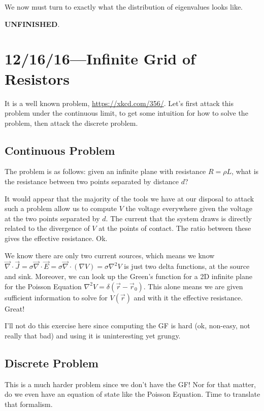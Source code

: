 \documentclass[12pt]{report}
\begin{document}
We now must turn to exactly what the distribution of eigenvalues looks like.

\textbf{UNFINISHED}.

\chapter{12/16/16---Infinite Grid of Resistors}

It is a well known problem, \url{https://xkcd.com/356/}. Let's first attack this
problem under the continuous limit, to get some intuition for how to solve the
problem, then attack the discrete problem.

\section{Continuous Problem}

The problem is as follows: given an infinite plane with resistance $R = \rho L$,
what is the resistance between two points separated by distance $d$?

It would appear that the majority of the tools we have at our disposal to attack
such a problem allow us to compute $V$ the voltage everywhere given the voltage
at the two points separated by $d$. The current that the system draws is
directly related to the divergence of $V$ at the points of contact. The ratio
between these gives the effective resistance. Ok.

We know there are only two current sources, which means we know $\vec{\nabla}
\cdot \vec{J} = \sigma \vec{\nabla} \cdot \vec{E} = \sigma \vec{\nabla} \cdot
(\nabla V) = \sigma \nabla^2 V$ is just two delta functions, at the source and
sink. Moreover, we can look up the Green's function for a 2D infinite plane for
the Poisson Equation $\nabla^2 V = \delta(\vec{r} - \vec{r}_0)$. This alone
means we are given sufficient information to solve for $V(\vec{r})$ and with it
the effective resistance. Great!

I'll not do this exercise here since computing the GF is hard (ok, non-easy, not
really that bad) and using it is uninteresting yet grungy.

\section{Discrete Problem}

This is a much harder problem since we don't have the GF\@! Nor for that matter,
do we even have an equation of state like the Poisson Equation. Time to
translate that formalism.
\end{document}
